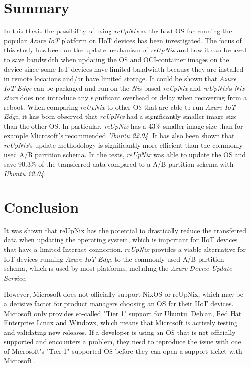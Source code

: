 \section{Summary}
In this thesis the possibility of using \textit{reUpNix} as the host \ac{OS} for
running the popular \textit{Azure IoT} platform on \ac{IIoT} devices has been investigated.
The focus of this study has been on the update mechanism of \textit{reUpNix} and how it can be used
to save bandwidth when updating the \ac{OS} and \ac{OCI}-container images on the device
since some \ac{IoT} devices have limited bandwidth because they are installed in
remote locations and/or have limited storage. It could be shown that \textit{Azure IoT Edge}
can be packaged and run on the \textit{Nix}-based \textit{reUpNix} and
\textit{reUpNix}'s \textit{Nix store} does not introduce any significant overhead
or delay when recovering from a reboot. When comparing \textit{reUpNix} to
other \ac{OS} that are able to run \textit{Azure IoT Edge}, it has been observed that \textit{reUpNix}
had a significantly smaller image size than the other \ac{OS}. In particular,
\textit{reUpNix} has a 43\% smaller image size than for example Microsoft's
recommended \textit{Ubuntu 22.04}. It has also been shown that \textit{reUpNix}'s update
methodology is significantly more efficient than the commonly used A/B partition
schema. In the tests, \textit{reUpNix} was able to update the \ac{OS} and save
90.3\% of the transferred data compared to a A/B partition schema with \textit{Ubuntu 22.04}.


\section{Conclusion}
It was shown that reUpNix has the potential to drastically reduce the transferred
data when updating the operating system, which is important for \ac{IIoT} devices
that have a limited Internet connection. \textit{reUpNix} provides a viable
alternative for \ac{IoT} devices running \textit{Azure IoT Edge}
to the commonly used A/B partition schema, which is used by most platforms,
including the \textit{Azure Device Update Service}.

However, Microsoft does not officially support NixOS or reUpNix, which may be a decisive factor
for product managers choosing an \ac{OS} for their \ac{IIoT} devices. Microsoft
only provides so-called "Tier 1" support for Ubuntu, Debian, Red Hat Enterprise
Linux and Windows, which means that Microsoft is actively testing and validating
new releases. If a developer is using an \ac{OS} that is not officially supported
and encounters a problem, they need to reproduce the issue with one of Microsoft's
"Tier 1" supported \ac{OS} before they can open a support ticket with Microsoft
\cite{msdoc-supportetplatforms}.

